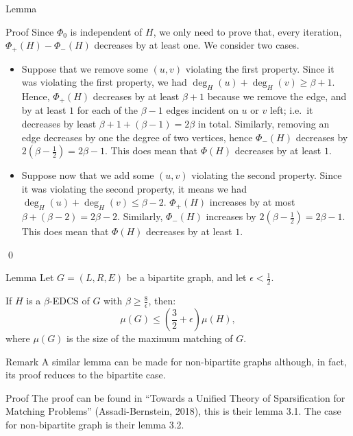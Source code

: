 \documentclass[a4paper]{article}
\begin{document}
\begin{parag}{Lemma}
\begin{subparag}{Proof}
        Since $\Phi_0$ is independent of $H$, we only need to prove that, every iteration, $\Phi_+\left(H\right) - \Phi_-\left(H\right)$ decreases by at least one. We consider two cases.
        \begin{itemize}[left=0pt]
            \item Suppose that we remove some $\left(u, v\right)$ violating the first property.  Since it was violating the first property, we had $\deg_H\left(u\right) + \deg_H\left(v\right) \geq \beta + 1$. Hence, $\Phi_+\left(H\right)$ decreases by at least $\beta + 1$ because we remove the edge, and by at least $1$ for each of the $\beta-1$ edges incident on $u$ or $v$ left; i.e.\ it decreases by least $\beta + 1 + \left(\beta - 1\right) = 2 \beta$ in total. Similarly, removing an edge decreases by one the degree of two vertices, hence $\Phi_{-}\left(H\right)$ decreases by $2 \left(\beta - \frac{1}{2}\right) = 2 \beta - 1$. This does mean that $\Phi\left(H\right)$ decreases by at least $1$.
            \item Suppose now that we add some $\left(u, v\right)$ violating the second property. Since it was violating the second property, it means we had $\deg_H\left(u\right) + \deg_H\left(v\right) \leq \beta - 2$. $\Phi_+\left(H\right)$ increases by at most $\beta + \left(\beta - 2\right) = 2\beta - 2$. Similarly, $\Phi_-\left(H\right)$ increases by $2 \left(\beta - \frac{1}{2}\right) = 2 \beta - 1$. This does mean that $\Phi\left(H\right)$ decreases by at least $1$.
        \end{itemize}
        
        \qed
    \end{subparag}
\end{parag}

\begin{parag}{Lemma}
    Let $G = \left(L, R, E\right)$ be a bipartite graph, and let $\epsilon < \frac{1}{2}$. 

    If $H$ is a $\beta$-EDCS of $G$ with $\beta \geq \frac{8}{\epsilon}$, then: 
    \[\mu\left(G\right) \leq \left(\frac{3}{2} + \epsilon\right)\mu\left(H\right),\]
    where $\mu\left(G\right)$ is the size of the maximum matching of $G$.

    \begin{subparag}{Remark}
        A similar lemma can be made for non-bipartite graphs although, in fact, its proof reduces to the bipartite case. 
    \end{subparag}

    \begin{subparag}{Proof}
        The proof can be found in ``Towards a Unified Theory of Sparsification for Matching Problems'' (Assadi-Bernstein, 2018), this is their lemma 3.1. The case for non-bipartite graph is their lemma 3.2.
    \end{subparag}
\end{parag}
\end{document}
